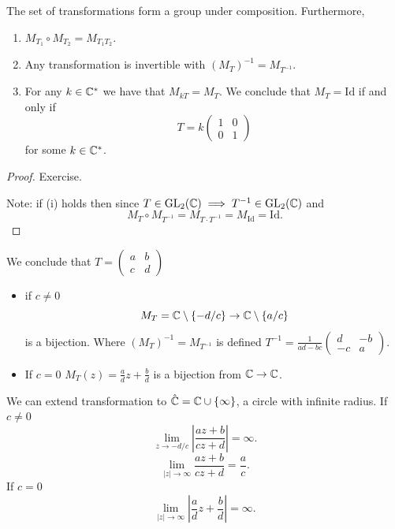 \documentclass[10pt, a4paper]{article}
\begin{document}
\begin{lemma}
    The set of \mobius transformations form a group under composition.
    Furthermore,
    \begin{enumerate}[label = (\roman*)]
        \item $M_{T_1} \circ M_{T_2} = M_{T_1T_2}$.

        \item Any \mobius transformation is invertible with $(M_T) ^ {-1} = M_{T ^ {-1}}$.

        \item For any $k \in \mathbb{C} ^ {*}$ we have that $M_{kT} = M_T$.
        We conclude that $M_T = \mathrm{Id}$ if and only if
        \[
        T = k\begin{pmatrix}
            1 & 0 \\ 0 & 1
        \end{pmatrix}
        \]
        for some $k \in \mathbb{C} ^ {*}$.
    \end{enumerate}

    \begin{proof}
        Exercise.

        Note:
        if (i) holds then since $T \in \mathrm{GL}_2(\mathbb{C}) \implies T ^ {-1} \in \mathrm{GL}_2(\mathbb{C})$ and
        \[
        M_T \circ M_{T ^ {-1}} = M_{T \cdot T ^ {-1}} = M_{\mathrm{Id}} = \mathrm{Id}.
        \]
    \end{proof}
\end{lemma}

We conclude that $T = \begin{pmatrix}
    a & b \\ c & d
\end{pmatrix}$
\begin{itemize}
    \item if $c \neq 0$
    \[
    M_T = \mathbb{C} \setminus \{-d / c\} \to \mathbb{C} \setminus \{a / c\}
    \]
    is a bijection.
    Where $(M_T) ^ {-1} = M_{T ^ {-1}}$ is defined $T ^ {-1} = \frac{1}{ad - bc}\begin{pmatrix}
        d & -b \\ -c & a
    \end{pmatrix}$.

    \item If $c = 0$ $M_T(z) = \frac{a}{d}z + \frac{b}{d}$ is a bijection from $\mathbb{C} \to \mathbb{C}$.
\end{itemize}

We can extend \mobius transformation to $\hat{\mathbb{C}} = \mathbb{C} \cup \{\infty\}$,
a circle with infinite radius.
If $c \neq 0$
\[
\lim_{z \to - d / c}\left|\frac{az + b}{cz + d}\right| = \infty.
\]
\[
\lim_{|z| \to \infty}\frac{az + b}{cz + d} = \frac{a}{c}.
\]
If $c = 0$
\[
\lim_{|z| \to \infty}\left|\frac{a}{d}z + \frac{b}{d}\right| = \infty.
\]
\end{document}
